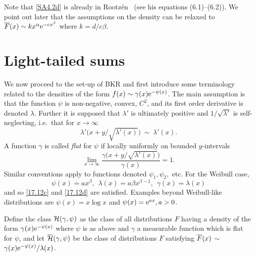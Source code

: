 Note that \eqref{SA4.2d} is already in Rootz\'en~\cite{rootzen1987ratio} (see his equations 
(6.1)--(6.2)). We point out later that the assumptions on the density can be relaxed
to $\overline F(x)\sim kx^{\alpha}\mathrm{e}^{-c x^\beta}$ where $k=d/c\beta$.


\section{Light-tailed sums}\label{S:BKR}

We now proceed to the set-up of BKR and first
introduce some terminology related to the densities of the form  $f(x)\sim \gamma(x)\mathrm{e}^{-\psi(x)}$.  The main assumption is that the function $\psi$ is non-negative, convex,
$C^2$,  and its first order derivative is denoted $\lambda$. Further it is supposed that
$\lambda'$ is ultimately positive and $1/\sqrt{\lambda'}$ is self-neglecting, i.e.\ that for $x\to\infty$
\begin{equation}\label{17.12c}
\lambda'\bigl(x+y/\sqrt{\lambda'(x)}\bigr)\ \sim\ \lambda'(x).
\end{equation}
A function $\gamma$ is called \emph{flat} for $\psi$ if locally uniformly on bounded $y$-intervals
\begin{equation}\label{17.12d}
\lim_{x\to \infty}\frac{ \gamma\bigl(x+y/\sqrt{\lambda'(x)}\bigr)}{\gamma(x)}=1.
\end{equation}
Similar conventions apply to functions denoted $\psi_1,\psi_2,$ etc.
For the Weibull case,
\[ \psi(x)=ax^\beta,\ \ \lambda(x)=a\beta x^{\beta-1},\ \ \gamma(x) = \lambda(x) \]
and so \eqref{17.12c} and \eqref{17.12d} are satisfied.
Examples beyond Weibull-like distributions are $\psi(x)=x\log x$ and $\psi(x)=\mathrm{e}^{ax},a>0$. 

Define the class ${\mathcal H}(\gamma,\psi)$ as the class of all distributions $F$ having a density
of the form $\gamma(x)\mathrm{e}^{-\psi(x)}$ where $\psi$ is as above and $\gamma$ a measurable function which is flat for $\psi$,
and let  $\overline{\mathcal H}(\gamma,\psi)$ be the class of  distributions $F$ satisfying 
$\overline F(x)$ $\sim$ $\gamma(x)\mathrm{e}^{-\psi(x)}/\lambda(x)$.

